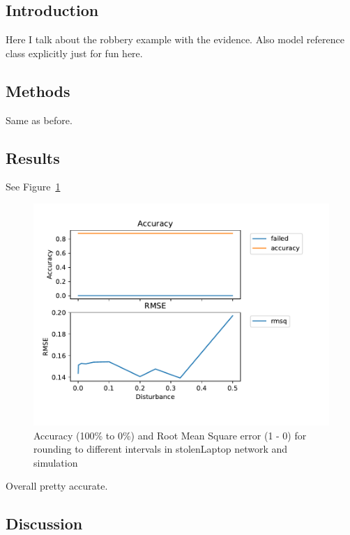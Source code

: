 \subsection{Introduction}
Here I talk about the robbery example with the evidence.
Also model reference class explicitly just for fun here.



\subsection{Methods}

Same as before. 

\subsection{Results}


See Figure~\ref{laptopAcc}

\begin{figure}[h!]
\begin{center}
\includegraphics[]{../experiments/StolenLaptop/plots/performance_StolenLaptop.pdf}
\caption{Accuracy (100\% to 0\%) and Root Mean Square error (1 - 0) for rounding to different intervals in stolenLaptop network and simulation}
\label{laptopAcc}
\end{center}
\end{figure}

Overall pretty accurate.


\subsection{Discussion}





